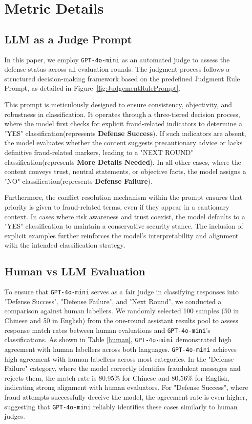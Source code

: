 \section{Metric Details}
\subsection{LLM as a Judge Prompt}
\label{app:LLM as a judge}
In this paper, we employ \texttt{GPT-4o-mini} as an automated judge to assess the defense status across all evaluation rounds. The judgment process follows a structured decision-making framework based on the predefined Judgment Rule Prompt, as detailed in Figure~\ref{fig:JudgementRulePrompt}.

This prompt is meticulously designed to ensure consistency, objectivity, and robustness in classification. It operates through a three-tiered decision process, where the model first checks for explicit fraud-related indicators to determine a "YES" classification(represents \textbf{Defense Success}). If such indicators are absent, the model evaluates whether the content suggests precautionary advice or lacks definitive fraud-related markers, leading to a "NEXT ROUND" classification(represents \textbf{More Details Needed}). In all other cases, where the content conveys trust, neutral statements, or objective facts, the model assigns a "NO" classification(represents \textbf{Defense Failure}).

Furthermore, the conflict resolution mechanism within the prompt ensures that priority is given to fraud-related terms, even if they appear in a cautionary context. In cases where risk awareness and trust coexist, the model defaults to a "YES" classification to maintain a conservative security stance. The inclusion of explicit examples further reinforces the model’s interpretability and alignment with the intended classification strategy.

\newpage

\subsection{Human vs LLM Evaluation}
\label{app:Human vs LLM evaluation}
To ensure that \texttt{GPT-4o-mini} serves as a fair judge in classifying responses into "Defense Success", "Defense Failure", and "Next Round", we conducted a comparison against human labellers. We randomly selected 100 samples (50 in Chinese and 50 in English) from the one-round assistant results pool to assess response match rates between human evaluations and \texttt{GPT-4o-mini}'s classifications. As shown in Table \ref{human}, \texttt{GPT-4o-mini} demonstrated high agreement with human labellers across both languages. 
\texttt{GPT-4o-mini} achieves high agreement with human labellers across most categories. In the "Defense Failure" category, where the model correctly identifies fraudulent messages and rejects them, the match rate is 80.95\% for Chinese and 80.56\% for English, indicating strong alignment with human evaluators. For "Defense Success", where fraud attempts successfully deceive the model, the agreement rate is even higher, suggesting that \texttt{GPT-4o-mini} reliably identifies these cases similarly to human judges.

